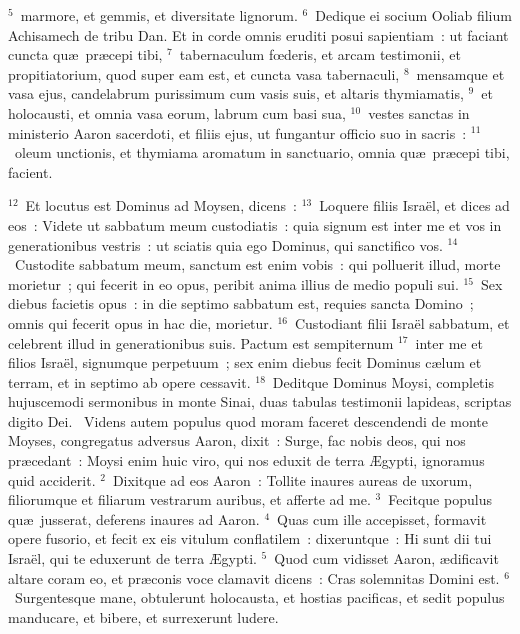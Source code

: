 ${}^{5}$~marmore, et gemmis, et diversitate lignorum.
${}^{6}$~Dedique ei socium Ooliab filium Achisamech de tribu Dan. Et in corde omnis eruditi posui sapientiam~: ut faciant cuncta qu\ae\ pr\ae cepi tibi,
${}^{7}$~tabernaculum fœderis, et arcam testimonii, et propitiatorium, quod super eam est, et cuncta vasa tabernaculi,
${}^{8}$~mensamque et vasa ejus, candelabrum purissimum cum vasis suis, et altaris thymiamatis,
${}^{9}$~et holocausti, et omnia vasa eorum, labrum cum basi sua,
${}^{10}$~vestes sanctas in ministerio Aaron sacerdoti, et filiis ejus, ut fungantur officio suo in sacris~:
${}^{11}$~oleum unctionis, et thymiama aromatum in sanctuario, omnia qu\ae\ pr\ae cepi tibi, facient.


${}^{12}$~Et locutus est Dominus ad Moysen, dicens~:
${}^{13}$~Loquere filiis Isra\"el, et dices ad eos~: Videte ut sabbatum meum custodiatis~: quia signum est inter me et vos in generationibus vestris~: ut sciatis quia ego Dominus, qui sanctifico vos.
${}^{14}$~Custodite sabbatum meum, sanctum est enim vobis~: qui polluerit illud, morte morietur~; qui fecerit in eo opus, peribit anima illius de medio populi sui.
${}^{15}$~Sex diebus facietis opus~: in die septimo sabbatum est, requies sancta Domino~; omnis qui fecerit opus in hac die, morietur.
${}^{16}$~Custodiant filii Isra\"el sabbatum, et celebrent illud in generationibus suis. Pactum est sempiternum
${}^{17}$~inter me et filios Isra\"el, signumque perpetuum~; sex enim diebus fecit Dominus c\ae lum et terram, et in septimo ab opere cessavit.
${}^{18}$~Deditque Dominus Moysi, completis hujuscemodi sermonibus in monte Sinai, duas tabulas testimonii lapideas, scriptas digito Dei.
~Videns autem populus quod moram faceret descendendi de monte Moyses, congregatus adversus Aaron, dixit~: Surge, fac nobis deos, qui nos pr\ae cedant~: Moysi enim huic viro, qui nos eduxit de terra \AE gypti, ignoramus quid acciderit.
${}^{2}$~Dixitque ad eos Aaron~: Tollite inaures aureas de uxorum, filiorumque et filiarum vestrarum auribus, et afferte ad me.
${}^{3}$~Fecitque populus qu\ae\ jusserat, deferens inaures ad Aaron.
${}^{4}$~Quas cum ille accepisset, formavit opere fusorio, et fecit ex eis vitulum conflatilem~: dixeruntque~: Hi sunt dii tui Isra\"el, qui te eduxerunt de terra \AE gypti.
${}^{5}$~Quod cum vidisset Aaron, \ae dificavit altare coram eo, et pr\ae conis voce clamavit dicens~: Cras solemnitas Domini est.
${}^{6}$~Surgentesque mane, obtulerunt holocausta, et hostias pacificas, et sedit populus manducare, et bibere, et surrexerunt ludere.


